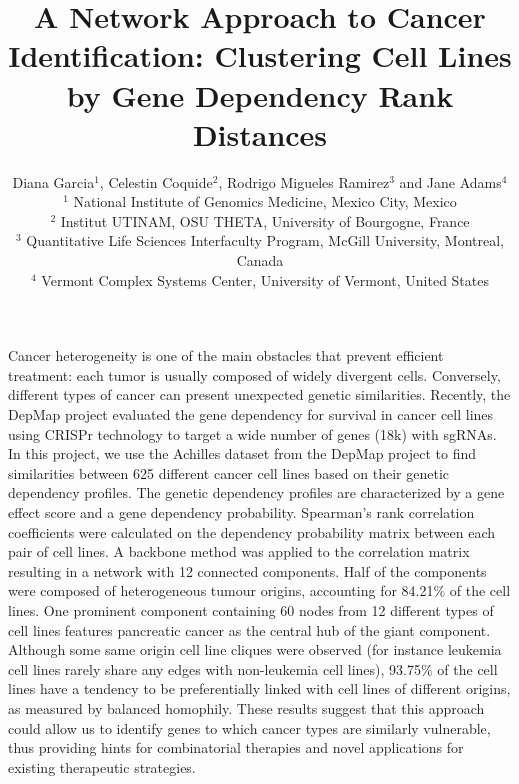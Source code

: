 \documentclass[12pt]{article}
\begin{document}
\title{\normalsize\bf \vspace{-8ex}
A Network Approach to Cancer Identification: Clustering Cell Lines by Gene Dependency Rank Distances}

\begingroup\onehalfspacing
\author{Diana Garcia$^1$, Celestin Coquide$^2$, Rodrigo Migueles Ramirez$^3$ and Jane Adams$^4$\\
\footnotesize
$^1$ National Institute of Genomics Medicine, Mexico City, Mexico\\ 
$^2$ Institut UTINAM, OSU THETA, University of Bourgogne, France\\
$^3$ Quantitative Life Sciences Interfaculty Program, McGill University, Montreal, Canada\\
$^4$ Vermont Complex Systems Center, University of Vermont, United States}
\endgroup



\date{\vspace{-5ex}} %

\maketitle

\thispagestyle{empty}
\pagestyle{empty}

Cancer heterogeneity is one of the main obstacles that prevent efficient treatment: each tumor is usually composed of widely divergent cells. Conversely, different types of cancer can present unexpected genetic similarities. Recently, the DepMap project \cite{Tsherniak17} evaluated the gene dependency for survival in cancer cell lines using CRISPr technology to target a wide number of genes (18k) with sgRNAs. In this project, we use the Achilles dataset from the DepMap project to find similarities between 625 different cancer cell lines based on their genetic dependency profiles. The genetic dependency profiles are characterized by a gene effect score and a gene dependency probability. Spearman’s rank correlation coefficients were calculated on the dependency probability matrix between each pair of cell lines. A backbone method  \cite{Serrano09} was applied to the correlation matrix resulting in a network with 12 connected components. Half of the components were composed of heterogeneous tumour origins, accounting for 84.21$\%$ of the cell lines. One prominent component containing 60 nodes from 12 different types of cell lines features pancreatic cancer as the central hub of the giant component. Although some same origin cell line cliques were observed (for instance leukemia cell lines rarely share any edges with non-leukemia cell lines), 93.75$\%$ of the cell lines have a tendency to be preferentially linked with cell lines of different origins, as measured by balanced homophily. These results suggest that this approach could allow us to identify genes to which cancer types are similarly vulnerable, thus providing hints for combinatorial therapies and novel applications for existing therapeutic strategies. 
\end{document}
